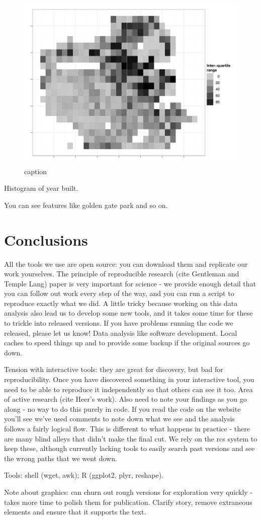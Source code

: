 \documentclass[oneside]{article}
\begin{document}
\begin{figure}[htbp]
    \includegraphics[width=0.5\linewidth]{sf-bin-iqr}
  \caption{caption}
  \label{fig:sf}
\end{figure}

Histogram of year built.

You can see features like golden gate park and so on.

\section{Conclusions}

All the tools we use are open source: you can download them and replicate our work yourselves.  The principle of reproducible research (cite Gentleman and Temple Lang) paper is very important for science - we provide enough detail that you can follow out work every step of the way, and you can run a script to reproduce exactly what we did.  A little tricky because working on this data analysis also lead us to develop some new tools, and it takes some time for these to trickle into released versions.  If you have problems running the code we released, please let us know!  Data analysis like software development.  Local caches to speed things up and to provide some backup if the original sources go down.

Tension with interactive tools: they are great for discovery, but bad for reproducibility.  Once you have discovered something in your interactive tool, you need to be able to reproduce it independently so that others can see it too.  Area of active research (cite Heer's work).  Also need to note your findings as you go along - no way to do this purely in code.  If you read the code on the website you'll see we've used comments to note down what we see and the analysis follows a fairly logical flow.  This is different to what happens in practice - there are many blind alleys that didn't make the final cut.  We rely on the rcs system to keep these, although currently lacking tools to easily search past versions and see the wrong paths that we went down.

Tools: shell (wget, awk); R (ggplot2, plyr, reshape).

Note about graphics: can churn out rough versions for exploration very quickly - takes more time to polish them for publication.  Clarify story, remove extraneous elements and ensure that it supports the text.



\end{document}
